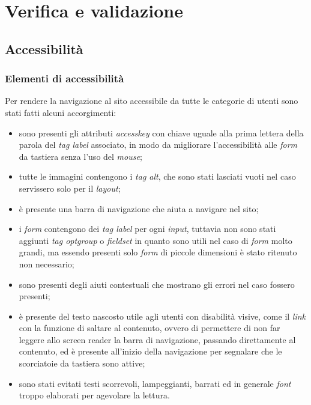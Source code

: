 
\chapter{Verifica e validazione}
\label{cap:verifica-validazione}


\section{Accessibilità}
\subsection{Elementi di accessibilità}
Per rendere la navigazione al sito accessibile da tutte le categorie di utenti sono stati fatti alcuni accorgimenti:
\begin{itemize}
    \item sono presenti gli attributi \textit{accesskey} con chiave uguale alla prima lettera della parola del \textit{tag label} associato, in modo da migliorare l'accessibilità alle \textit{form} da tastiera senza l'uso del \textit{mouse};
    \item tutte le immagini contengono i \textit{tag alt}, che sono stati lasciati vuoti nel caso servissero solo per il \textit{layout};
    \item è presente una barra di navigazione che aiuta a navigare nel sito;
    \item i \textit{form} contengono dei \textit{tag label} per ogni \textit{input}, tuttavia non sono stati aggiunti \textit{tag optgroup} o \textit{fieldset} in quanto sono utili nel caso di \textit{form} molto grandi, ma essendo presenti solo \textit{form} di piccole dimensioni è stato ritenuto non necessario;
    \item sono presenti degli aiuti contestuali che mostrano gli errori nel caso fossero presenti;
    \item è presente del testo nascosto utile agli utenti con disabilità visive, come il \textit{link} con la funzione  di saltare al contenuto, ovvero di permettere di non far leggere allo \gls{screen reader} la barra di navigazione, passando direttamente al contenuto, ed è presente all'inizio della navigazione per segnalare che le scorciatoie da tastiera sono attive;
    \item sono stati evitati testi scorrevoli, lampeggianti, barrati ed in generale \textit{font} troppo elaborati per agevolare la lettura.
\end{itemize}

